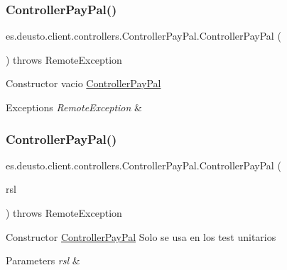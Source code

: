 \subsubsection{\texorpdfstring{ControllerPayPal()}{ControllerPayPal()}\hspace{0.1cm}{\footnotesize\ttfamily [1/2]}}
{\footnotesize\ttfamily es.\+deusto.\+client.\+controllers.\+Controller\+Pay\+Pal.\+Controller\+Pay\+Pal (\begin{DoxyParamCaption}{ }\end{DoxyParamCaption}) throws Remote\+Exception}

Constructor vacio \mbox{\hyperlink{classes_1_1deusto_1_1client_1_1controllers_1_1_controller_pay_pal}{Controller\+Pay\+Pal}} 
\begin{DoxyExceptions}{Exceptions}
{\em Remote\+Exception} & \\
\hline
\end{DoxyExceptions}
\mbox{\label{classes_1_1deusto_1_1client_1_1controllers_1_1_controller_pay_pal_a45be65cb09058057fb47cf99277582d8}} 
\subsubsection{\texorpdfstring{ControllerPayPal()}{ControllerPayPal()}\hspace{0.1cm}{\footnotesize\ttfamily [2/2]}}
{\footnotesize\ttfamily es.\+deusto.\+client.\+controllers.\+Controller\+Pay\+Pal.\+Controller\+Pay\+Pal (\begin{DoxyParamCaption}\item[{\mbox{\hyperlink{classes_1_1deusto_1_1client_1_1remote_1_1_service_locator}{Service\+Locator}}}]{rsl }\end{DoxyParamCaption}) throws Remote\+Exception}

Constructor \mbox{\hyperlink{classes_1_1deusto_1_1client_1_1controllers_1_1_controller_pay_pal}{Controller\+Pay\+Pal}} Solo se usa en los test unitarios 
\begin{DoxyParams}{Parameters}
{\em rsl} & \\
\hline
\end{DoxyParams}

